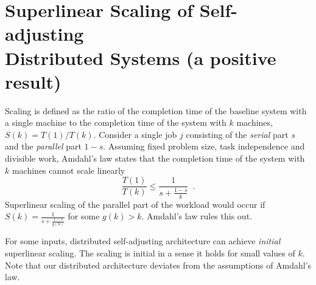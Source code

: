 \appendix

\section{Superlinear Scaling of Self-adjusting\\ Distributed Systems (a positive result)}
\label{sec:arch-scaling}


Scaling is defined as the ratio of the completion time of the baseline system with a single machine to the completion time of the system with $k$ machines, $S(k) = T(1) / T(k)$.
Consider a single job $j$ consisting of the \emph{serial} part $s$ and the \emph{parallel} part $1-s$.
Assuming fixed problem size, task independence and divisible work, Amdahl's law states that the completion time of the system with $k$ machines cannot scale linearly
\begin{equation*}\label{eq:mtf-perf}
  \frac{T(1)}{T(k)} \le \frac1{s + \frac{1-s}{k}} \enspace .
\end{equation*}
Superlinear scaling of the parallel part of the workload would occur if $S(k) = \frac1{s + \frac{1-s}{g(k)}}$ for some $g(k) > k$. Amdahl's law rules this out.


For some inputs, distributed self-adjusting architecture can achieve \emph{initial} superlinear scaling. The scaling is initial in a sense it holds for small values of $k$.
Note that our distributed architecture deviates from the assumptions of Amdahl's law.














